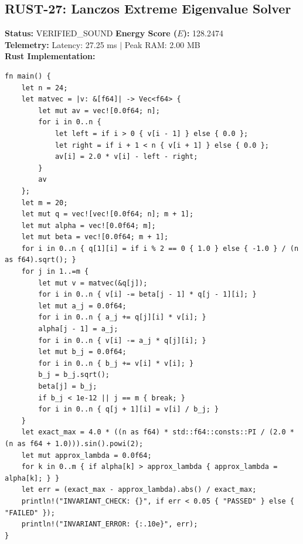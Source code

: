 \documentclass[11pt, a4paper]{article}
\begin{document}
\subsection{RUST-27: Lanczos Extreme Eigenvalue Solver}
\textbf{Status:} VERIFIED\_SOUND \hfill \textbf{Energy Score ($E$):} 128.2474\\
\textbf{Telemetry:} Latency: 27.25 ms $|$ Peak RAM: 2.00 MB\\
\textbf{Rust Implementation:}
\begin{verbatim}
fn main() {
    let n = 24;
    let matvec = |v: &[f64]| -> Vec<f64> {
        let mut av = vec![0.0f64; n];
        for i in 0..n {
            let left = if i > 0 { v[i - 1] } else { 0.0 };
            let right = if i + 1 < n { v[i + 1] } else { 0.0 };
            av[i] = 2.0 * v[i] - left - right;
        }
        av
    };
    let m = 20;
    let mut q = vec![vec![0.0f64; n]; m + 1];
    let mut alpha = vec![0.0f64; m];
    let mut beta = vec![0.0f64; m + 1];
    for i in 0..n { q[1][i] = if i % 2 == 0 { 1.0 } else { -1.0 } / (n as f64).sqrt(); }
    for j in 1..=m {
        let mut v = matvec(&q[j]);
        for i in 0..n { v[i] -= beta[j - 1] * q[j - 1][i]; }
        let mut a_j = 0.0f64;
        for i in 0..n { a_j += q[j][i] * v[i]; }
        alpha[j - 1] = a_j;
        for i in 0..n { v[i] -= a_j * q[j][i]; }
        let mut b_j = 0.0f64;
        for i in 0..n { b_j += v[i] * v[i]; }
        b_j = b_j.sqrt();
        beta[j] = b_j;
        if b_j < 1e-12 || j == m { break; }
        for i in 0..n { q[j + 1][i] = v[i] / b_j; }
    }
    let exact_max = 4.0 * ((n as f64) * std::f64::consts::PI / (2.0 * (n as f64 + 1.0))).sin().powi(2);
    let mut approx_lambda = 0.0f64;
    for k in 0..m { if alpha[k] > approx_lambda { approx_lambda = alpha[k]; } }
    let err = (exact_max - approx_lambda).abs() / exact_max;
    println!("INVARIANT_CHECK: {}", if err < 0.05 { "PASSED" } else { "FAILED" });
    println!("INVARIANT_ERROR: {:.10e}", err);
}
\end{verbatim}
\end{document}
